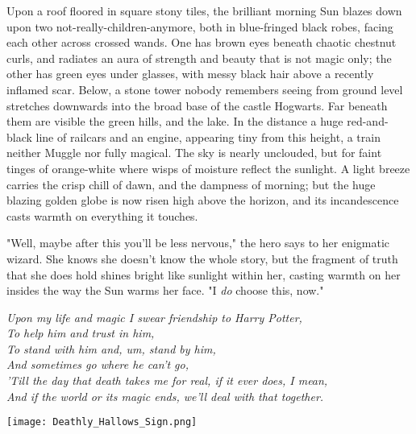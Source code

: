 \later

Upon a roof floored in square stony tiles, the brilliant morning Sun blazes
down upon two not-really-children-anymore, both in blue-fringed black robes,
facing each other across crossed wands. One has brown eyes beneath chaotic
chestnut curls, and radiates an aura of strength and beauty that is not magic
only; the other has green eyes under glasses, with messy black hair above a
recently inflamed scar. Below, a stone tower nobody remembers seeing from
ground level stretches downwards into the broad base of the castle Hogwarts.
Far beneath them are visible the green hills, and the lake. In the distance a
huge red-and-black line of railcars and an engine, appearing tiny from this
height, a train neither Muggle nor fully magical. The sky is nearly unclouded,
but for faint tinges of orange-white where wisps of moisture reflect the
sunlight. A light breeze carries the crisp chill of dawn, and the dampness of
morning; but the huge blazing golden globe is now risen high above the horizon,
and its incandescence casts warmth on everything it touches.

"Well, maybe after this you'll be less nervous," the hero says to her enigmatic
wizard. She knows she doesn't know the whole story, but the fragment of truth
that she does hold shines bright like sunlight within her, casting warmth on
her insides the way the Sun warms her face. "I \emph{do} choose this, now."

\noindent{}\emph{Upon my life and magic I swear friendship to Harry Potter,}\\
\emph{To help him and trust in him,}\\
\emph{To stand with him and, um, stand by him,}\\
\emph{And sometimes go where he can't go,}\\
\emph{'Till the day that death takes me for real, if it ever does, I mean,}\\
\emph{And if the world or its magic ends, we'll deal with that together.}

\vspace*{\fill}
{
\begin{center}
\texttt{[image: Deathly\_Hallows\_Sign.png]}
\end{center}
}
\vspace*{\fill}
\clearpage
